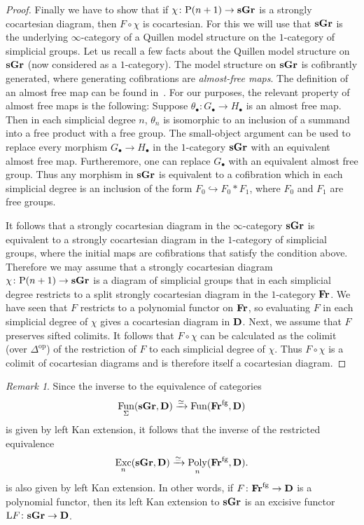 \documentclass[psamsfonts]{amsart}
\theoremstyle{plain}
\theoremstyle{definition}
\theoremstyle{remark}
\newtheorem{rem}[thm]{Remark}
\newcommand{\catname}[1]{{\normalfont\textbf{#1}}}
\newcommand{\op}{{\mathrm{op}}}
\newcommand{\fr}{\allfr^{\mathrm{fg}}}
\newcommand{\allfr}{\catname{Fr}}
\newcommand{\sgr}{\catname{sGr}}
\newcommand{\lkan}{\mathrm{L}}
\newcommand{\power}{\mathrm{P}}
\DeclareMathOperator{\fun}{Fun}
\DeclareMathOperator{\poly}{Poly}
\DeclareMathOperator{\exc}{Exc}
\begin{document}
\begin{proof}
Finally we have to show that if $\chi\colon \power(n+1)\to\sgr$ is a strongly cocartesian diagram, then $F\circ \chi$ is cocartesian. For this we will use that $\sgr$ is the underlying $\infty$-category of a Quillen model structure on the $1$-category of simplicial groups. Let us recall a few facts about the Quillen model structure on $\sgr$ (now considered as a $1$-category). The model structure on $\sgr$ is cofibrantly generated, where generating cofibrations are {\it almost-free maps}. The definition of an almost free map can be found in~\cite[Page 257]{Goerss-Jardine}. For our purposes, the relevant property of almost free maps is the following: Suppose $\theta_\bullet \colon G_\bullet\to H_\bullet$ is an almost free map. Then in each simplicial degree $n$, $\theta_n$ is isomorphic to an inclusion of a summand into a free product with a free group. The small-object argument can be used to replace every morphism $ G_\bullet\to H_\bullet$ in the $1$-category $\sgr$ with an equivalent almost free  map. Furtheremore, one can replace $G_\bullet$ with an equivalent almost free group. Thus any morphism in $\sgr$ is equivalent to a cofibration which in each simplicial degree is an inclusion of the form $F_0\hookrightarrow F_0 * F_1$, where $F_0$ and $F_1$ are free groups.

It follows that a strongly cocartesian diagram in the $\infty$-category $\sgr$ is equivalent to a strongly cocartesian diagram in the $1$-category of simplicial groups, where the initial maps are cofibrations that satisfy the condition above. Therefore we may assume that a strongly cocartesian diagram $\chi\colon \power(n+1)\to\sgr$ is a diagram of simplicial groups that in each simplicial degree restricts to a split strongly cocartesian diagram in the $1$-category $\allfr$. We have seen that $F$ restricts to a polynomial functor on $\allfr$, so evaluating $F$ in each simplicial degree of $\chi$ gives a cocartesian diagram in $\catname{D}$. Next, we assume that $F$ preserves sifted colimits. It follows that $F\circ \chi$ can be calculated as the colimit (over $\Delta^{\op}$) of the restriction of $F$ to each simplicial degree of $\chi$. Thus $F\circ \chi$ is a colimit of cocartesian diagrams and is therefore itself a cocartesian diagram.
\end{proof}
\begin{rem}
Since the inverse to the equivalence of categories
\[
\fun_{\Sigma}(\sgr, \catname{D}) \xrightarrow{\simeq} \fun(\fr, \catname{D})
\]
is given by left Kan extension, it follows that the inverse of the restricted equivalence
\[
\exc_n(\sgr, \catname{D}) \xrightarrow{\simeq} \poly_n(\fr, \catname{D}).
\]
is also given by left Kan extension. In other words, if $F\colon \fr \to \catname{D}$ is a polynomial functor, then its left Kan extension to $\sgr$ is an excisive functor $\lkan F \colon \sgr\to \catname{D}$.
\end{rem}
\end{document}
